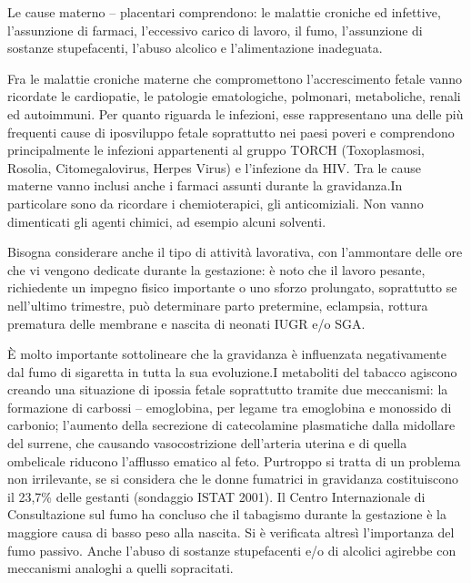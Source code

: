 Le cause materno -- placentari comprendono: le malattie croniche ed infettive, l'assunzione di farmaci, l'eccessivo carico di lavoro, il fumo, l'assunzione di sostanze stupefacenti, l'abuso alcolico e l'alimentazione inadeguata.

Fra le malattie croniche materne che compromettono l'accrescimento fetale vanno ricordate le cardiopatie, le patologie ematologiche, polmonari, metaboliche, renali ed autoimmuni. Per quanto riguarda le infezioni, esse rappresentano una delle più frequenti cause di iposviluppo fetale soprattutto nei paesi poveri e comprendono principalmente le infezioni appartenenti al gruppo TORCH (Toxoplasmosi, Rosolia, Citomegalovirus, Herpes Virus) e l'infezione da HIV.
Tra le cause materne vanno inclusi anche i farmaci assunti durante la gravidanza.In particolare sono da ricordare i chemioterapici, gli anticomiziali. Non vanno dimenticati gli agenti chimici, ad esempio alcuni solventi.

Bisogna considerare anche il tipo di attivit\`a lavorativa, con l'ammontare delle ore
che vi vengono dedicate durante la gestazione: \`e noto che il lavoro pesante, 
richiedente un impegno fisico importante o uno sforzo prolungato, soprattutto se nell'ultimo trimestre,
può determinare parto pretermine, eclampsia, rottura prematura delle membrane e nascita di neonati IUGR e/o SGA\cite{sga-14}.

\`E molto importante sottolineare che la gravidanza è influenzata negativamente dal fumo di sigaretta in tutta la sua evoluzione.I metaboliti del tabacco agiscono creando
una situazione di ipossia fetale soprattutto tramite due meccanismi: la formazione di carbossi -- emoglobina, 
per legame tra emoglobina e monossido di carbonio; l'aumento della secrezione di catecolamine plasmatiche
dalla midollare del surrene, che causando vasocostrizione dell'arteria uterina e di quella ombelicale riducono l'afflusso ematico al feto.
Purtroppo si tratta di un problema non irrilevante, se si considera che le donne fumatrici in gravidanza costituiscono il 23,7\% delle gestanti (sondaggio ISTAT 2001).
Il Centro Internazionale di Consultazione sul fumo ha concluso che il tabagismo durante la gestazione \`e la maggiore causa di basso peso alla nascita\cite{sga-18}.
Si \`e verificata altres\`i l'importanza del fumo passivo\cite{sga-20}. Anche l'abuso di sostanze stupefacenti e/o di alcolici agirebbe con  meccanismi analoghi a quelli sopracitati\cite{sga-24}\cite{sga-25}.


